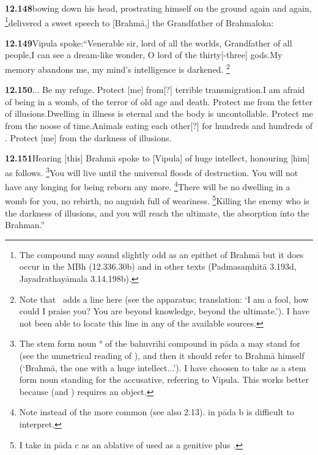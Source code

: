 \textbf{12.148}bowing down his head, prostrating himself on the ground again and again,%
\footnote{The compound  may sound                  slightly odd as an epithet of Brahmā but it does occur                  in the MBh (12.336.30b) and in other texts (Padmasaṃhitā 3.193d, Jayadrathayāmala 3.14.198b).  }delivered a sweet speech to [Brahmā,] the Grandfather of Brahmaloka:%


\textbf{12.149}Vipula spoke:``Venerable sir, lord of all the worlds, Grandfather of all people,I can see a dream-like wonder, O lord of the thirty[-three] gods.My memory abandons me, my mind's intelligence is darkened.%
\footnote{Note that \Ed\ adds a line here (see the apparatus; translation:                 `I am a fool, how could I praise you? You are beyond knowledge, beyond the ultimate.').                 I have not been able to locate this line in any of the available sources.  }%


\textbf{12.150}... Be my refuge. Protect [me] from[?] terrible transmigration.I am afraid of being in a womb, of the terror of old age and death.                                 Protect me from the fetter of illusions.Dwelling in illness is eternal and the body is uncontollable.                                 Protect me from the noose of time.Animals eating each other[?] for hundreds and hundreds of .                                Protect [me] from the darkness of illusions.%


\textbf{12.151}Hearing [this] Brahmā spoke to [Vipula] of huge intellect, honouring [him] as follows.%
\footnote{The stem form noun ° of the bahuvrīhi compound                  in pāda a may stand for  (see the unmetrical reading of \msCa\msCb\msNa), and                 then it should refer to Brahmā himself (`Brahmā, the one with a huge intellect...').                 I have choosen to take  as a stem form noun standing for the accusative,                 referring to Vipula. This works better because  (and ) requires an object.  }You will live until the universal floods of destruction.                        You will not have any longing for being reborn any more.%
\footnote{Note  instead of the more common  (see also 2.13).                          in pāda b is difficult to interpret.  }There will be no dwelling in a womb for you, no rebirth,                                         no anguish full of weariness.%
\footnote{I take  in pāda c as an ablative of  used as a genitive plus .  }Killing the enemy who is the darkness of illusions,                        and you will reach the ultimate, the absorption into the Brahman.''%


